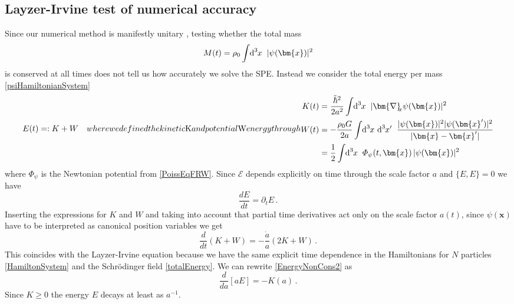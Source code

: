 \documentclass[twocolumn, nofootinbib, showpacs, superscriptaddress]{revtex4-1}
\newcommand{\thbar}{\tilde\hbar}
\newcommand{\vol}[2]{\hspace{-0.8mm}\mbox{$\text{d}^{\hspace{-0.0mm}#1}$}\hspace{-0.2mm}#2\hspace{0.8mm}\ }
\renewcommand{\v}[1]{\bm{#1} }
\newcommand{\vx}[0]{\bm{x} }
\newcommand{\vnabla}[0]{\bm{\nabla} }
\begin{document}
\subsection{Layzer-Irvine test of numerical accuracy}
Since our numerical method  is manifestly unitary \cite{GoldbergScheySchwartz1967},  
testing whether the total mass $$M(t)= \rho_0 \int \vol{3}{x} | \psi(\vx)|^2 $$ is conserved at all times does not tell us how accurately we solve the SPE.
 Instead we consider the total energy per mass \eqref{psiHamiltonianSystem}
 \begin{subequations} \label{totalEnergy}
 \begin{align}
  E(t) & =:  K +  W  
  \end{align}
where we defined the kinetic $K$ and potential $W$ energy through
\begin{align}
 K(t) &= \frac{\thbar^2}{2 a^2} \int \vol{3}{x} |\vnabla_{\!\! x} \psi(\vx)|^2  \\
 W(t) &  =  - \frac{ \rho_0 G }{2 a} \int \vol{3}{x} \vol{3}{x'} \frac{  |\psi(\vx)|^2 |\psi(\v{x}')|^2}{|\vx-\v{x}'|}\\ 
& =\frac{1}{2} \int \vol{3}{x} \varPhi_\psi(t,\vx)\, |\psi(\vx)|^2 
\end{align}
\end{subequations}
where $\varPhi_\psi$ is the Newtonian potential from \eqref{PoissEqFRW}.
Since $\mathcal{E}$ depends explicitly on time through the scale factor $a$ and $\{E,E \} = 0$ we have 
\begin{equation}
\frac{d  E}{dt} = \partial_t  E \,. \label{EnergyNonCons}
\end{equation}
Inserting the expressions for $ K$ and $ W$ and taking into account that partial time derivatives act only on the scale factor $a(t)$, since $\psi(\vx)$ have to be interpreted as canonical position variables we get 
\begin{equation}
\frac{d}{dt}(  K +  W)  =-  \frac{\dot a}{a} (2  K +  W) \,.\label{EnergyNonCons2}
\end{equation}
This coincides with the Layzer-Irvine equation \cite{Layzer1963, P80, JoyceLabini2013, SousbieColombi2016}
because we have the same explicit time dependence in the Hamiltonians for $N$ particles \eqref{HamiltonSystem} and the Schr\"odinger field \eqref{totalEnergy}. 
We can rewrite  \eqref{EnergyNonCons2} as
\begin{equation}
\frac{d}{da}\left[ a E \right] =- K(a)\label{EnergyNonCons3} \,.
\end{equation}
 Since $K\geq 0$ the energy $E$ decays at least as $a^{-1}$.
\end{document}
